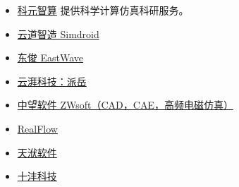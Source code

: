 
\begin{itemize}
\item \href{https://www.keyuanzhisuan.com/}{科元智算} 提供科学计算仿真科研服务。
\item \href{https://www.ibe.cn/}{云道智造 Simdroid}
\item \href{https://www.eastfdtd.com/index.aspx}{东俊 EastWave}
\item \href{https://www.yunpaikeji.com.cn/cpfw}{云湃科技：派岳}
\item \href{https://www.zwsoft.cn/product/cae/waves}{中望软件 ZWsoft（CAD，CAE，高频电磁仿真）}
\item \href{https://www.realflow.com.cn/}{RealFlow}
\item \href{https://www.njtf.cn/}{天洑软件}
\item \href{https://www.tenfong.cn/}{十沣科技}
\end{itemize}

